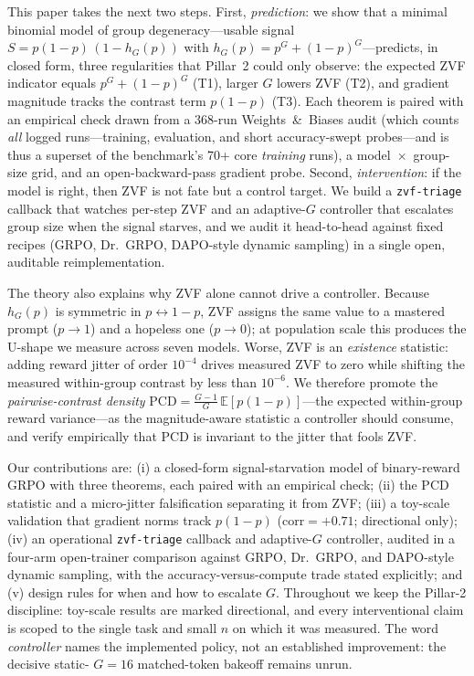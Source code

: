 \documentclass{article}
\newcommand{\E}{\mathbb{E}}
\begin{document}
This paper takes the next two steps. First, \emph{prediction}: we show that a
minimal binomial model of group degeneracy---usable signal
$S = p(1-p)\,(1 - h_G(p))$ with $h_G(p) = p^G + (1-p)^G$---predicts, in
closed form, three regularities that Pillar~2 could only observe: the
expected ZVF indicator equals $p^G + (1-p)^G$ (T1), larger $G$ lowers ZVF
(T2), and gradient magnitude tracks the contrast term $p(1-p)$ (T3). Each
theorem is paired with an empirical check drawn from a 368-run
Weights~\&~Biases audit (which counts \emph{all} logged runs---training,
evaluation, and short accuracy-swept probes---and is thus a superset of the
benchmark's 70+ core \emph{training} runs), a model~$\times$~group-size grid, and an
open-backward-pass gradient probe. Second, \emph{intervention}: if the model
is right, then ZVF is not fate but a control target. We build a
\texttt{zvf-triage} callback that watches per-step ZVF and an adaptive-$G$
controller that escalates group size when the signal starves, and we audit it
head-to-head against fixed recipes (GRPO, Dr.~GRPO, DAPO-style dynamic
sampling) in a single open, auditable reimplementation.

The theory also explains why ZVF alone cannot drive a controller. Because
$h_G(p)$ is symmetric in $p \leftrightarrow 1-p$, ZVF assigns the same value
to a mastered prompt ($p \to 1$) and a hopeless one ($p \to 0$); at
population scale this produces the U-shape we measure across seven models.
Worse, ZVF is an \emph{existence} statistic: adding reward jitter
of order $10^{-4}$ drives measured ZVF to zero while shifting the measured
within-group contrast by less than $10^{-6}$. We therefore promote the
\emph{pairwise-contrast density}
$\mathrm{PCD} = \frac{G-1}{G}\,\E[p(1-p)]$---the expected within-group reward
variance---as the magnitude-aware statistic a controller should consume, and
verify empirically that PCD is invariant to the jitter that fools ZVF.

Our contributions are:
(i) a closed-form signal-starvation model of binary-reward GRPO with three
theorems, each paired with an empirical check;
(ii) the PCD statistic and a micro-jitter falsification separating it from
ZVF;
(iii) a toy-scale validation that gradient norms track $p(1-p)$
($\mathrm{corr} = +0.71$; directional only);
(iv) an operational \texttt{zvf-triage} callback and adaptive-$G$ controller,
audited in a four-arm open-trainer comparison against GRPO, Dr.~GRPO, and
DAPO-style dynamic sampling, with the accuracy-versus-compute trade stated
explicitly; and
(v) design rules for when and how to escalate $G$.
Throughout we keep the Pillar-2 discipline: toy-scale results are marked
directional, and every interventional claim is scoped to the single task and
small $n$ on which it was measured. The word \emph{controller} names the
implemented policy, not an established improvement: the decisive static-
$G{=}16$ matched-token bakeoff remains unrun.
\end{document}
